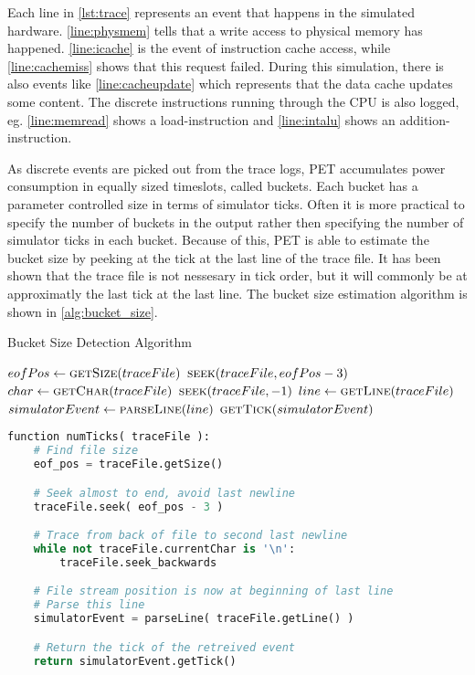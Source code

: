Each line in \autoref{lst:trace} represents an event that happens in the
simulated hardware.  \autoref{line:physmem} tells that a write access to
physical memory has happened. \autoref{line:icache} is the event of instruction
cache access, while \autoref{line:cachemiss} shows that this request failed.
During this simulation, there is also events like \autoref{line:cacheupdate}
which represents that the data cache updates some content. The discrete
instructions running through the CPU is also logged, eg. \autoref{line:memread}
shows a load-instruction and \autoref{line:intalu} shows an
addition-instruction.

As discrete events are picked out from the trace logs, PET accumulates power
consumption in equally sized timeslots, called buckets. Each bucket has a
parameter controlled size in terms of simulator ticks. Often it is more
practical to specify the number of buckets in the output rather then specifying
the number of simulator ticks in each bucket. Because of this, PET is able to
estimate the bucket size by peeking at the tick at the last line of the trace
file. It has been shown that the trace file is not nessesary in tick order,
but it will commonly be at approximatly the last tick at the last line. The
bucket size estimation algorithm is shown in \autoref{alg:bucket_size}.

\begin{algorithm}
    \caption{Bucket Size Detection Algorithm}
    \label{alg:bucket_size}
    \begin{algorithmic}

        \State $eofPos \gets \Call{getSize}{traceFile}$
        \State $\Call{seek}{traceFile, eofPos - 3}$
        \State
        \State $char \gets \Call{getChar}{traceFile}$
            \State $\Call{seek}{traceFile, -1}$
        \EndWhile
        \State $line \gets \Call{getLine}{traceFile}$
        \State $simulatorEvent \gets \Call{parseLine}{line}$
        \State \Return $\Call{getTick}{simulatorEvent}$
        \EndFunction
    \end{algorithmic}
    \begin{lstlisting}[language=Python]
function numTicks( traceFile ):
    # Find file size
    eof_pos = traceFile.getSize()

    # Seek almost to end, avoid last newline
    traceFile.seek( eof_pos - 3 )

    # Trace from back of file to second last newline
    while not traceFile.currentChar is '\n':
        traceFile.seek_backwards

    # File stream position is now at beginning of last line
    # Parse this line
    simulatorEvent = parseLine( traceFile.getLine() )

    # Return the tick of the retreived event
    return simulatorEvent.getTick()
    \end{lstlisting}
\end{algorithm}


